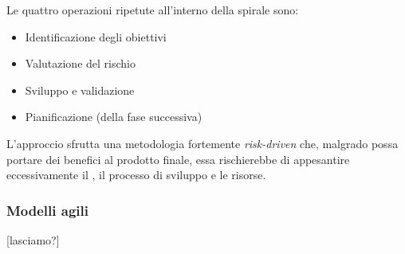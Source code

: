 			Le quattro operazioni ripetute all'interno della spirale sono:
\begin{itemize}
\item Identificazione degli obiettivi
\item Valutazione del rischio
\item Sviluppo e validazione
\item Pianificazione (della fase successiva)
\end{itemize}			 

L'approccio sfrutta una metodologia fortemente \textit{risk-driven} che, malgrado possa portare dei benefici al prodotto finale, essa rischierebbe di appesantire eccessivamente il , il processo di sviluppo e le risorse.
		\subsubsection{Modelli agili}
[lasciamo?]



